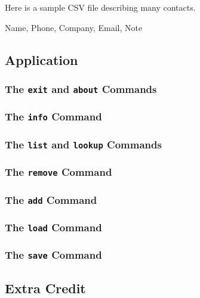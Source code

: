 \documentclass[11pt]{cselabheader}
\begin{document}
Here is a sample CSV file describing many contacts.

\begin{verbatimcode}
Name, Phone, Company, Email, Note
\end{verbatimcode}

\subsection{Application}


\subsubsection{The \texttt{exit} and \texttt{about} Commands}

\subsubsection{The \texttt{info} Command}

\subsubsection{The \texttt{list} and \texttt{lookup} Commands}

\subsubsection{The \texttt{remove} Command}

\subsubsection{The \texttt{add} Command}

\subsubsection{The \texttt{load} Command}

\subsubsection{The \texttt{save} Command}

\subsection{Extra Credit}
\end{document}

